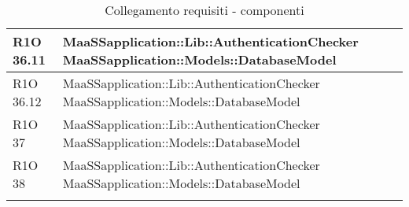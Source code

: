 \begin{center}
\begin{longtable}{ | l | p{8cm} |}
   	R1O 36.11 & MaaSSapplication::Lib::AuthenticationChecker \newline  MaaSSapplication::Models::DatabaseModel \\ \hline
   	
   	R1O 36.12 & MaaSSapplication::Lib::AuthenticationChecker \newline  MaaSSapplication::Models::DatabaseModel \\ \hline
   	
   	R1O 37 & MaaSSapplication::Lib::AuthenticationChecker \newline  MaaSSapplication::Models::DatabaseModel \\ \hline
   	
   	R1O 38 & MaaSSapplication::Lib::AuthenticationChecker \newline  MaaSSapplication::Models::DatabaseModel \\ \hline
        
    \caption{Collegamento requisiti - componenti}
  \end{longtable}
  \egroup
\end{center} 